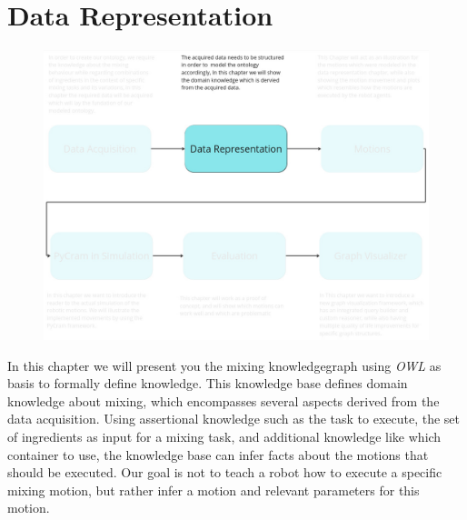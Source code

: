 \chapter{Data Representation}
\label{chap:Data_representation}
\begin{figure}[H]
    \includegraphics[scale=0.3]{Graphics/overview_2.jpg}
\end{figure} 
In this chapter we will present you the mixing knowledgegraph using \textit{OWL} as basis to formally define knowledge.
This knowledge base defines domain knowledge about mixing, which encompasses several aspects derived from the data acquisition.
Using assertional knowledge such as the task to execute, the set of ingredients as input for a mixing task, 
and additional knowledge like which container to use, the knowledge base can infer facts about the motions that should be executed.
Our goal is not to teach a robot how to execute a specific mixing motion, but rather infer a motion and relevant parameters for this motion. 
